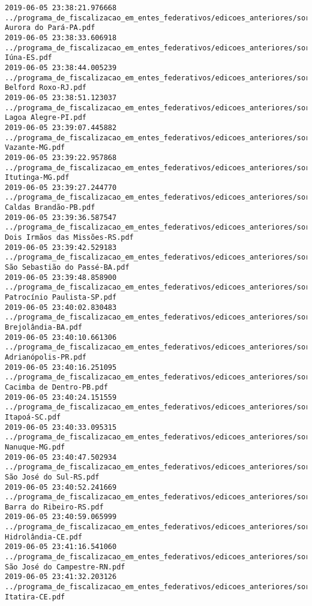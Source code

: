 \begin{lstlisting}
2019-06-05 23:38:21.976668 ../programa_de_fiscalizacao_em_entes_federativos/edicoes_anteriores/sorteio_37/2821-Aurora do Pará-PA.pdf
2019-06-05 23:38:33.606918 ../programa_de_fiscalizacao_em_entes_federativos/edicoes_anteriores/sorteio_37/2761-Iúna-ES.pdf
2019-06-05 23:38:44.005239 ../programa_de_fiscalizacao_em_entes_federativos/edicoes_anteriores/sorteio_37/2837-Belford Roxo-RJ.pdf
2019-06-05 23:38:51.123037 ../programa_de_fiscalizacao_em_entes_federativos/edicoes_anteriores/sorteio_37/2847-Lagoa Alegre-PI.pdf
2019-06-05 23:39:07.445882 ../programa_de_fiscalizacao_em_entes_federativos/edicoes_anteriores/sorteio_37/2859-Vazante-MG.pdf
2019-06-05 23:39:22.957868 ../programa_de_fiscalizacao_em_entes_federativos/edicoes_anteriores/sorteio_37/2811-Itutinga-MG.pdf
2019-06-05 23:39:27.244770 ../programa_de_fiscalizacao_em_entes_federativos/edicoes_anteriores/sorteio_37/2777-Caldas Brandão-PB.pdf
2019-06-05 23:39:36.587547 ../programa_de_fiscalizacao_em_entes_federativos/edicoes_anteriores/sorteio_37/2793-Dois Irmãos das Missões-RS.pdf
2019-06-05 23:39:42.529183 ../programa_de_fiscalizacao_em_entes_federativos/edicoes_anteriores/sorteio_37/2789-São Sebastião do Passé-BA.pdf
2019-06-05 23:39:48.858900 ../programa_de_fiscalizacao_em_entes_federativos/edicoes_anteriores/sorteio_37/2877-Patrocínio Paulista-SP.pdf
2019-06-05 23:40:02.830483 ../programa_de_fiscalizacao_em_entes_federativos/edicoes_anteriores/sorteio_37/2843-Brejolândia-BA.pdf
2019-06-05 23:40:10.661306 ../programa_de_fiscalizacao_em_entes_federativos/edicoes_anteriores/sorteio_37/2807-Adrianópolis-PR.pdf
2019-06-05 23:40:16.251095 ../programa_de_fiscalizacao_em_entes_federativos/edicoes_anteriores/sorteio_37/2849-Cacimba de Dentro-PB.pdf
2019-06-05 23:40:24.151559 ../programa_de_fiscalizacao_em_entes_federativos/edicoes_anteriores/sorteio_37/2845-Itapoá-SC.pdf
2019-06-05 23:40:33.095315 ../programa_de_fiscalizacao_em_entes_federativos/edicoes_anteriores/sorteio_37/2855-Nanuque-MG.pdf
2019-06-05 23:40:47.502934 ../programa_de_fiscalizacao_em_entes_federativos/edicoes_anteriores/sorteio_37/2871-São José do Sul-RS.pdf
2019-06-05 23:40:52.241669 ../programa_de_fiscalizacao_em_entes_federativos/edicoes_anteriores/sorteio_37/2865-Barra do Ribeiro-RS.pdf
2019-06-05 23:40:59.065999 ../programa_de_fiscalizacao_em_entes_federativos/edicoes_anteriores/sorteio_37/2783-Hidrolândia-CE.pdf
2019-06-05 23:41:16.541060 ../programa_de_fiscalizacao_em_entes_federativos/edicoes_anteriores/sorteio_37/2763-São José do Campestre-RN.pdf
2019-06-05 23:41:32.203126 ../programa_de_fiscalizacao_em_entes_federativos/edicoes_anteriores/sorteio_37/2831-Itatira-CE.pdf

\end{lstlisting}
